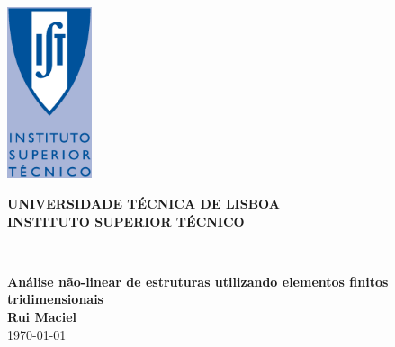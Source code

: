 
%
\thispagestyle{empty}%
%

\begin{minipage}[c]{0.2\textwidth}
    \centering
\hspace{-2cm}\includegraphics[width=2.5cm,clip]{figures/frontmatter/Logo_IST_color.eps}
\end{minipage}%
\begin{minipage}[c]{0.8\textwidth}
    \centering
\begin{Large}
\textbf{
UNIVERSIDADE TÉCNICA DE LISBOA\\[0.5cm]
INSTITUTO SUPERIOR TÉCNICO}
\end{Large}
\end{minipage}\\[3cm]%
%
\mbox{}
\vfill
\begin{center}
\textbf{\huge{Análise não-linear de estruturas utilizando elementos finitos tridimensionais}}\\[3cm]
\textbf{\Large{Rui Maciel}}\\
\vfill
\today
\vfill
\end{center}
%
\cleardoublepage %
%
